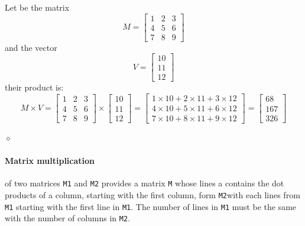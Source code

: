 \begin{exemplu}
Let be the matrix
\[
M = \begin{bmatrix}
    1 & 2 & 3 \\
    4 & 5 & 6\\
    7 & 8 & 9
    \end{bmatrix}
\]
and the vector 
\[
V = \begin{bmatrix}
    10 \\
    11 \\
    12 
    \end{bmatrix}
\] 
their product is:
\[
M \times V = \begin{bmatrix}
    1 & 2 & 3 \\
    4 & 5 & 6\\
    7 & 8 & 9
    \end{bmatrix}
    \times
    \begin{bmatrix}
    10 \\
    11 \\
    12
    \end{bmatrix}
    = 
    \begin{bmatrix}
    1 \times 10 + 2 \times 11 + 3 \times 12 \\
    4 \times 10 + 5 \times 11 + 6 \times 12  \\
    7 \times 10 + 8 \times 11 + 9 \times 12 
    \end{bmatrix}
    = 
     \begin{bmatrix}
    68 \\
    167 \\
    326
    \end{bmatrix}
\]

$\diamond$
\end{exemplu}

\paragraph{Matrix multiplication} of two matrices {\tt M1} and {\tt M2} provides a matrix {\tt M} whose lines a contains the dot products of a column, starting with the first column, form {\tt M2}with each lines from {\tt M1} starting with the first line in {\tt M1}. The number of lines in {\tt M1} must be the same with the number of columns in {\tt M2}.

